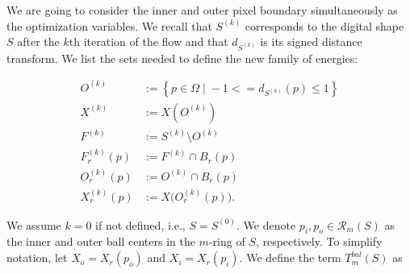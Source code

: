 %
%
%
%
%
%
%



We are going to consider the inner and outer pixel boundary simultaneously as the optimization variables. We recall that $S^{(k)}$ corresponds to the digital shape $S$ after the $k$th iteration of the flow and that $d_{S^{(k)}}$ is its signed distance transform. We list the sets needed to define the new family of energies:

\begin{align*}
	O^{(k)} &:=\left\{ p \in \Omega \; | \; -1 <= d_{S^{(k)}}(p) \leq 1 \right\}\\
	X^{(k)} &:= X(O^{(k)})  \\
	F^{(k)} &:= S^{(k)} \setminus O^{(k)} \\
	F_r^{(k)}(p) &:= F^{(k)} \cap B_r(p)\\
	O_r^{(k)}(p) &:= O^{(k)} \cap B_r(p) \\
	X_r^{(k)}(p) &:= X\big( O_r^{(k)}(p) \big).
\end{align*}

We assume $k=0$ if not defined, i.e., $S=S^{(0)}$. We denote $p_i, p_o \in \mathcal{R}_m(S)$ as the inner and outer ball centers in the $m$-ring of $S$, respectively. To simplify notation, let $X_o=X_r(p_o)$ and $X_i=X_r(p_i)$. We define the term $T_{m}^{bal}(S)$ as

